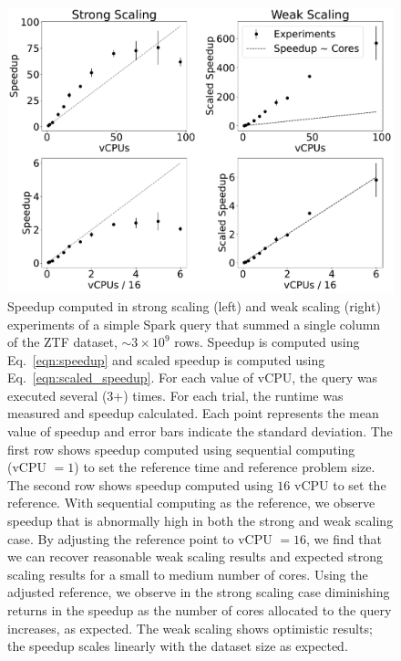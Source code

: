 \documentclass[twocolumn, linenumbers]{aastex631}
\begin{document}
\begin{figure}
    \centering
    \includegraphics[width=\linewidth]{scaling_all.pdf}
    \caption{Speedup computed in strong scaling (left) and weak scaling (right) experiments of a simple Spark query that summed a single column of the ZTF dataset, ${\sim} 3\times10^9$ rows. Speedup is computed using Eq.~\ref{eqn:speedup} and scaled speedup is computed using Eq.~\ref{eqn:scaled_speedup}. For each value of vCPU, the query was executed several (3+) times. For each trial, the runtime  was measured and speedup calculated. Each point represents the mean value of speedup and error bars indicate the standard deviation. The first row shows speedup computed using sequential computing (vCPU $= 1$) to set the reference time and reference problem size. The second row shows speedup computed using $16$ vCPU to set the reference. With sequential computing as the reference, we observe speedup that is abnormally high in both the strong and weak scaling case. By adjusting the reference point to vCPU $= 16$, we find that we can recover reasonable weak scaling results and expected strong scaling results for a small to medium number of cores. Using the adjusted reference, we observe in the strong scaling case diminishing returns in the speedup as the number of cores allocated to the query increases, as expected. The weak scaling shows optimistic results; the speedup scales linearly with the dataset size as expected.}
    \label{fig:scaling}
\end{figure}
\end{document}
